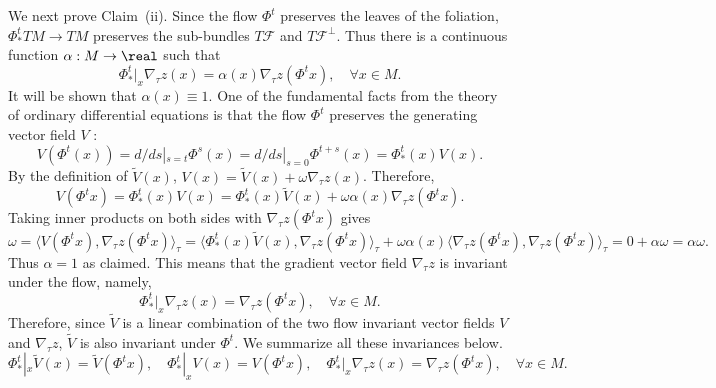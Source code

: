 \documentclass[12pt,oneside]{article}
\newcommand{\Fol}{\mathcal{F}}
\newcommand{\metric}{\tau}
\begin{document}
We next prove Claim~(ii). Since the flow $\Phi^t$ preserves the leaves of the foliation, $\Phi^t_* TM \to TM$ preserves the sub-bundles $T\Fol$ and $T\Fol^\bot$. Thus there is a continuous function $\alpha:M\to\real$ such that 
%
\[\Phi^t_*|_x \nabla_\metric z(x) = \alpha(x) \nabla_\metric z(\Phi^t x), \quad \forall x\in M. \]
%
It will be shown that $\alpha(x)\equiv 1$. One of the fundamental facts from the theory of ordinary differential equations is that the flow $\Phi^t$ preserves the generating vector field $V$ :
%
\begin{equation} \label{eqn:Flow_commut_Gen}
     V(\Phi^t(x)) = d/ds|_{s=t} \Phi^s(x) = d/ds|_{s=0} \Phi^{t+s}(x) = \Phi^t_* (x)V(x) .
\end{equation}
%
By the definition of $\tilde{V}(x)$, $V(x) = \tilde{V}(x) + \omega \nabla_\metric z(x)$. Therefore,
\[ V(\Phi^t x) = \Phi^t_* (x)V(x) = \Phi^t_* (x)\tilde{V}(x) + \omega \alpha(x) \nabla_\metric z(\Phi^t x).   \]
%
Taking inner products on both sides with $\nabla_\metric z(\Phi^t x)$ gives
%
\[\omega = \langle V(\Phi^t x) , \nabla_\metric z(\Phi^t x) \rangle_\metric = \langle \Phi^t_* (x)\tilde{V}(x), \nabla_\metric z(\Phi^t x) \rangle_\metric + \omega \alpha(x) \langle\nabla_\metric z(\Phi^t x) , \nabla_\metric z(\Phi^t x) \rangle_\metric = 0 + \alpha\omega = \alpha\omega. \]
%
Thus $\alpha=1$ as claimed. This means that the gradient vector field $\nabla_\metric z$ is invariant under the flow, namely,
%
\[\Phi^t_*|_x \nabla_\metric z(x) = \nabla_\metric z(\Phi^t x), \quad \forall x\in M. \]
%
Therefore, since $\tilde{V}$ is a linear combination of the two flow invariant vector fields $V$ and $\nabla_\metric z$, $\tilde{V}$ is also invariant under $\Phi^t$. We summarize all these invariances below.
%
\begin{equation}\label{eqn:inv_vector}
\Phi^t_*|_x \tilde{V}(x) = \tilde{V}(\Phi^t x), \quad \Phi^t_*|_x V(x) = V(\Phi^t x), \quad \Phi^t_*|_x \nabla_\metric z(x) = \nabla_\metric z(\Phi^t x), \quad \forall x\in M. 
\end{equation}
\end{document}
